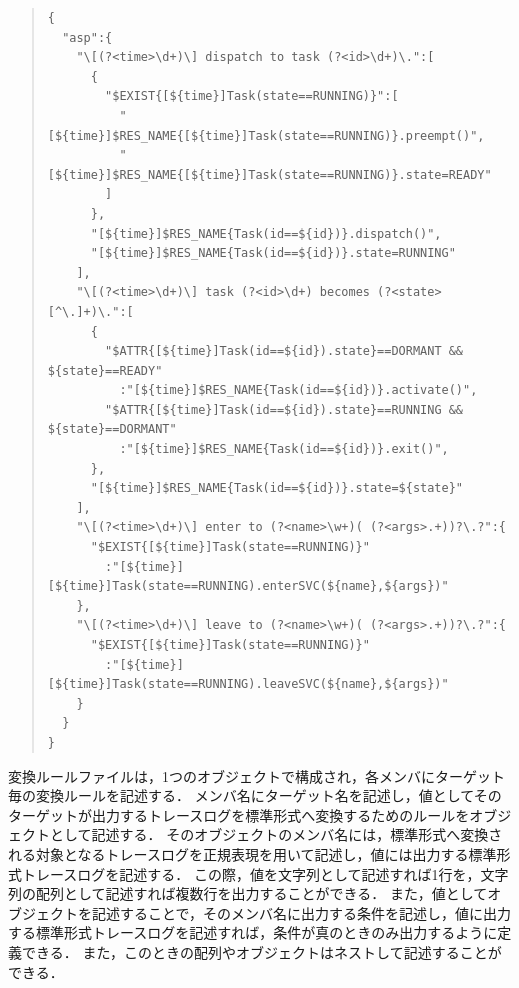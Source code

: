 \begin{table}[h]
{\scriptsize
\begin{quote}
\bkcounttrue
\caption{変換ルールファイルの例}
\label{convertRuleFileSample}
\begin{breakbox}
\setlength{\baselineskip}{0.8\normalbaselineskip}
\begin{verbatim}
{
  "asp":{
    "\[(?<time>\d+)\] dispatch to task (?<id>\d+)\.":[
      {
        "$EXIST{[${time}]Task(state==RUNNING)}":[
          "[${time}]$RES_NAME{[${time}]Task(state==RUNNING)}.preempt()",
          "[${time}]$RES_NAME{[${time}]Task(state==RUNNING)}.state=READY"
        ]
      },
      "[${time}]$RES_NAME{Task(id==${id})}.dispatch()",
      "[${time}]$RES_NAME{Task(id==${id})}.state=RUNNING"
    ],
    "\[(?<time>\d+)\] task (?<id>\d+) becomes (?<state>[^\.]+)\.":[
      {
        "$ATTR{[${time}]Task(id==${id}).state}==DORMANT && ${state}==READY"
          :"[${time}]$RES_NAME{Task(id==${id})}.activate()",
        "$ATTR{[${time}]Task(id==${id}).state}==RUNNING && ${state}==DORMANT"
          :"[${time}]$RES_NAME{Task(id==${id})}.exit()",
      },
      "[${time}]$RES_NAME{Task(id==${id})}.state=${state}"
    ],
    "\[(?<time>\d+)\] enter to (?<name>\w+)( (?<args>.+))?\.?":{
      "$EXIST{[${time}]Task(state==RUNNING)}"
        :"[${time}][${time}]Task(state==RUNNING).enterSVC(${name},${args})"
    },
    "\[(?<time>\d+)\] leave to (?<name>\w+)( (?<args>.+))?\.?":{
      "$EXIST{[${time}]Task(state==RUNNING)}"
        :"[${time}][${time}]Task(state==RUNNING).leaveSVC(${name},${args})"
    }
  }
}
\end{verbatim}
\end{breakbox}
\end{quote}
}
\end{table}

変換ルールファイルは，1つのオブジェクトで構成され，各メンバにターゲット毎の変換ルールを記述する．
メンバ名にターゲット名を記述し，値としてそのターゲットが出力するトレースログを標準形式へ変換するためのルールをオブジェクトとして記述する．
そのオブジェクトのメンバ名には，標準形式へ変換される対象となるトレースログを正規表現を用いて記述し，値には出力する標準形式トレースログを記述する．
この際，値を文字列として記述すれば1行を，文字列の配列として記述すれば複数行を出力することができる．
また，値としてオブジェクトを記述することで，そのメンバ名に出力する条件を記述し，値に出力する標準形式トレースログを記述すれば，条件が真のときのみ出力するように定義できる．
また，このときの配列やオブジェクトはネストして記述することができる．

